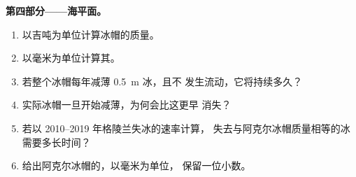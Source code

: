 \begin{problem}
\medskip\noindent\textbf{第四部分——海平面。}
\begin{enumerate}[resume]
\item 以吉吨为单位计算冰帽的质量。
\item 以毫米为单位计算其。
\item 若整个冰帽每年减薄 \qty{0.5}{m} 冰，且不
  发生流动，它将持续多久？
\item 实际冰帽一旦开始减薄，为何会比这更早
  消失？
\item 若以 2010--2019 年格陵兰失冰的速率计算，
  失去与阿克尔冰帽质量相等的冰需要多长时间？
\item 给出阿克尔冰帽的，以毫米为单位，
  保留一位小数。
\end{enumerate}
\end{problem}

